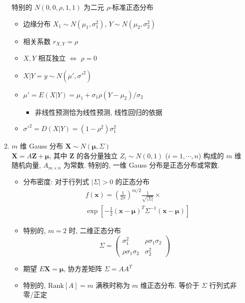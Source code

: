 \documentclass[11pt,a4paper,twocolumn]{article} %
\numberwithin{equation}{section} %
\renewcommand*{\vec}[1]{\bm{#1}} %
\begin{document}
\begin{enumerate}
	特别的 $N(0, 0, \rho, 1, 1)$ 为二元 $\rho$-标准正态分布
	\begin{itemize}
		\item 边缘分布 $X_1\sim N(\mu_1, \sigma_1^2)$, 
		$Y\sim N(\mu_2, \sigma_2^2)$
		\item 相关系数 $r_{X,Y} = \rho$
		\item $X, Y$ 相互独立 $\Leftrightarrow$ $\rho = 0$
		\item $X|Y=y \sim N(\mu', \sigma'^2)$
		\item $\mu' = E(X | Y ) = \mu_1 + \sigma_1 \rho (Y-\mu_2)/\sigma_2$ \\
		\begin{itemize}
			\item 非线性预测恰为线性预测, 线性回归的依据
		\end{itemize}
		\item $\sigma'^2 = D(X | Y ) = (1-\rho^2)\sigma_1^2$
	\end{itemize}
	\item $m$ 维 Gauss 分布 $\vec X\sim N(\vec \mu, \Sigma)$ \\
	$\vec X = A\vec Z +\vec \mu$, 其中 
	$\vec Z$ 的各分量独立 $Z_i\sim N(0, 1)$ ($i = 1, \cdots, n$) 
	构成的 $m$ 维随机向量, $A_{m\times n}$ 为常数. 
	特别的, 一维 Gauss 分布是正态分布或常数.
	\begin{itemize}
		\item 分布密度: 对于行列式 $|\Sigma|>0$ 的正态分布
		\begin{equation}
		\begin{split}\label{equ:dist_func_gauss}
			&f(\vec x) = \left(\frac{1}{2\pi}\right)^{m/2} 
			\frac{1}{\sqrt{|\Sigma|}} \times \\
			&\exp\left[-\frac 12 (\vec x - \vec\mu)^T\Sigma^{-1}
			(\vec x - \vec\mu)\right]
		\end{split}
		\end{equation}
		\item 特别的, $m=2$ 时, 二维正态分布
		\begin{equation}
			\Sigma = \begin{pmatrix}
				\sigma_1^2 & \rho\sigma_1\sigma_2 \\
				\rho\sigma_1\sigma_2 & \sigma_2^2
			\end{pmatrix}
		\end{equation}
		\item 期望 $E\vec X = \vec \mu$, 协方差矩阵 $\Sigma = AA^T$
		\item 特别的, $\mathrm{Rank}[A] = m$ 满秩时称为 $m$ 维正态分布. 
		等价于 $\Sigma$ 行列式非零/正定

\end{itemize}
\end{enumerate}
\end{document}
